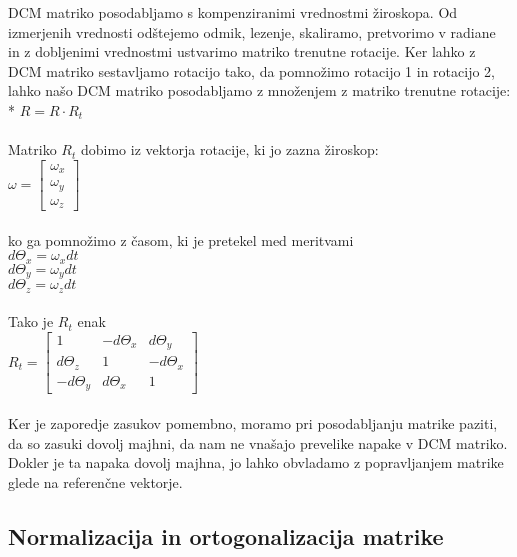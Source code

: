 \documentclass[]{article}
\begin{document}
DCM matriko posodabljamo s kompenziranimi vrednostmi žiroskopa. Od izmerjenih vrednosti odštejemo odmik, lezenje, skaliramo, pretvorimo v radiane in z dobljenimi vrednostmi ustvarimo matriko trenutne rotacije. Ker lahko z DCM matriko sestavljamo rotacijo tako, da pomnožimo rotacijo 1 in rotacijo 2, lahko našo DCM matriko posodabljamo z množenjem z matriko trenutne rotacije:\\*
$ R = R \cdot R_{t} $\\\\
Matriko $ R_{t} $ dobimo iz vektorja rotacije, ki jo zazna žiroskop:\\
$ \omega = \left[ \begin{array}{c}
 \omega_{x}\\ 
 \omega_{y}\\ 
\omega_{z}
\end{array}\right]   $\\\\
ko ga pomnožimo z časom, ki je pretekel med meritvami\\
$ d\Theta_{x} = \omega_{x}dt $\\
$ d\Theta_{y} = \omega_{y}dt $\\
$ d\Theta_{z} = \omega_{z}dt $\\\\
Tako je $ R_{t} $ enak\\
$ R_{t}= \left[ \begin{array}{ccc}
1 & -d\Theta_{x} & d\Theta_{y} \\ 
d\Theta_{z} & 1 & -d\Theta_{x} \\ 
-d\Theta_{y} & d\Theta_{x}& 1
\end{array} \right]  $\\\\
Ker je zaporedje zasukov pomembno, moramo pri posodabljanju matrike paziti, da so zasuki dovolj majhni, da nam ne vnašajo prevelike napake v DCM matriko. Dokler je ta napaka dovolj majhna, jo lahko obvladamo z popravljanjem matrike glede na referenčne vektorje.

\subsection{Normalizacija in ortogonalizacija matrike}
\end{document}
